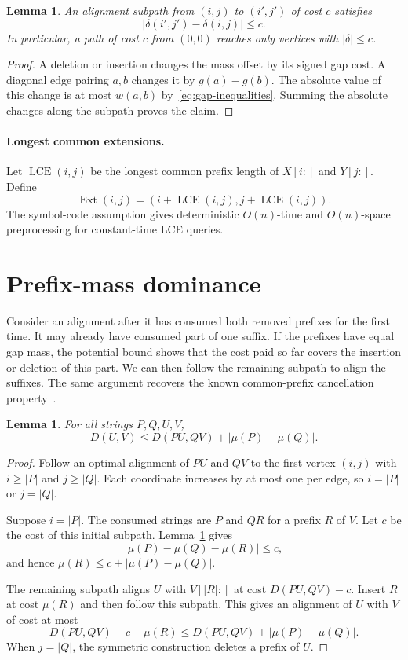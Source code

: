 \documentclass[11pt]{article}
\newtheorem{lemma}[theorem]{Lemma}
\theoremstyle{remark}
\newcommand{\lce}{\operatorname{LCE}}
\newcommand{\Ext}{\operatorname{Ext}}
\begin{document}
\begin{lemma}\label{lem:potential}
An alignment subpath from $(i,j)$ to $(i',j')$ of cost $c$ satisfies
\[
 |\delta(i',j')-\delta(i,j)|\le c.
\]
In particular, a path of cost $c$ from $(0,0)$ reaches only vertices
with $|\delta|\le c$.
\end{lemma}
\begin{proof}
A deletion or insertion changes the mass offset by its signed gap
cost. A diagonal edge pairing $a,b$ changes it by $g(a)-g(b)$.
The absolute value of this change is at most $w(a,b)$
by~\eqref{eq:gap-inequalities}. Summing the absolute changes along
the subpath proves the claim.
\end{proof}

\paragraph{Longest common extensions.}\label{sec:lce}
Let $\lce(i,j)$ be the longest common prefix length of $X[i:]$ and
$Y[j:]$. Define
\[
 \Ext(i,j)=(i+\lce(i,j),j+\lce(i,j)).
\]
The symbol-code assumption gives deterministic $O(n)$-time and
$O(n)$-space preprocessing for constant-time LCE queries.


\section{Prefix-mass dominance}\label{sec:dominance}

Consider an alignment after it has consumed both removed prefixes
for the first time. It may already have consumed part of one suffix.
If the prefixes have equal gap mass, the potential bound shows that
the cost paid so far covers the insertion or deletion of this part.
We can then follow the remaining subpath to align the suffixes.
The same argument recovers the known common-prefix cancellation
property~\cite{CKW23}.

\begin{lemma}\label{lem:removal}
For all strings $P,Q,U,V$,
\[
 D(U,V)\le D(PU,QV)+|\mu(P)-\mu(Q)|.
\]
\end{lemma}
\begin{proof}
Follow an optimal alignment of $PU$ and $QV$ to the first vertex
$(i,j)$ with $i\ge|P|$ and $j\ge|Q|$.
Each coordinate increases by at most one per edge, so
$i=|P|$ or $j=|Q|$.

Suppose $i=|P|$. The consumed strings are $P$ and $QR$ for a
prefix $R$ of $V$. Let $c$ be the cost of this initial subpath.
Lemma~\ref{lem:potential} gives
\[
 |\mu(P)-\mu(Q)-\mu(R)|\le c,
\]
and hence $\mu(R)\le c+|\mu(P)-\mu(Q)|$.

The remaining subpath aligns $U$ with $V[|R|:]$ at cost $D(PU,QV)-c$.
Insert $R$ at cost $\mu(R)$ and then follow this subpath.
This gives an alignment of $U$ with $V$ of cost at most
\[
 D(PU,QV)-c+\mu(R)
 \le D(PU,QV)+|\mu(P)-\mu(Q)|.
\]
When $j=|Q|$, the symmetric construction deletes a prefix of $U$.
\end{proof}
\end{document}
